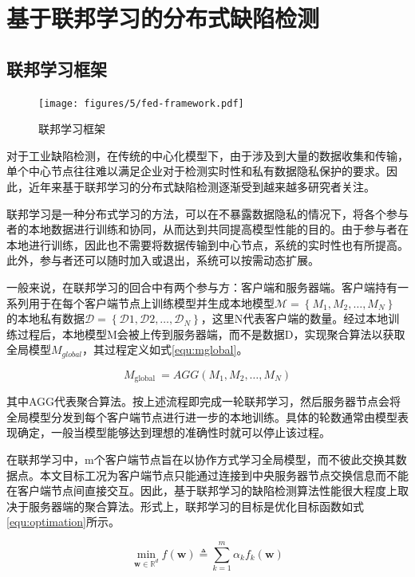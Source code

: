 \chapter{基于联邦学习的分布式缺陷检测}
\section{联邦学习框架}
\begin{figure}[htbp]
  \centering
  \texttt{[image: figures/5/fed-framework.pdf]}
  \caption{联邦学习框架}\label{fig:fed-framework}
\end{figure}
对于工业缺陷检测，在传统的中心化模型下，由于涉及到大量的数据收集和传输，单个中心节点往往难以满足企业对于检测实时性和私有数据隐私保护的要求。因此，近年来基于联邦学习的分布式缺陷检测逐渐受到越来越多研究者关注。

联邦学习是一种分布式学习的方法，可以在不暴露数据隐私的情况下，将各个参与者的本地数据进行训练和协同，从而达到共同提高模型性能的目的。由于参与者在本地进行训练，因此也不需要将数据传输到中心节点，系统的实时性也有所提高。此外，参与者还可以随时加入或退出，系统可以按需动态扩展。

一般来说，在联邦学习的回合中有两个参与方：客户端和服务器端。客户端持有一系列用于在每个客户端节点上训练模型并生成本地模型$\mathcal{M}=\left\{M_{1}, M_{2}, \ldots, M_{N}\right\}$ 的本地私有数据$\mathcal{D}=\left\{\mathcal{D}{1}, \mathcal{D}{2}, \ldots, \mathcal{D}_{N}\right\}$，这里N代表客户端的数量。经过本地训练过程后，本地模型M会被上传到服务器端，而不是数据D，实现聚合算法以获取全局模型$M_{global}$，其过程定义如式\ref{equ:mglobal}。

\begin{equation}\label{equ:mglobal}
  M_{\text {global }}=A G G\left(M_{1}, M_{2}, \ldots, M_{N}\right)
\end{equation}

其中AGG代表聚合算法。按上述流程即完成一轮联邦学习，然后服务器节点会将全局模型分发到每个客户端节点进行进一步的本地训练。具体的轮数通常由模型表现确定，一般当模型能够达到理想的准确性时就可以停止该过程。

在联邦学习中，m个客户端节点旨在以协作方式学习全局模型，而不彼此交换其数据点。本文目标工况为客户端节点只能通过连接到中央服务器节点交换信息而不能在客户端节点间直接交互。因此，基于联邦学习的缺陷检测算法性能很大程度上取决于服务器端的聚合算法。形式上，联邦学习的目标是优化目标函数如式\ref{equ:optimation}所示。

\begin{equation}\label{equ:optimation}
  \min _{\boldsymbol{w} \in \mathbb{R}^{d}} f(\boldsymbol{w}) \triangleq \sum_{k=1}^{m} \alpha_{k}f_{k}(\boldsymbol{w})
\end{equation}

